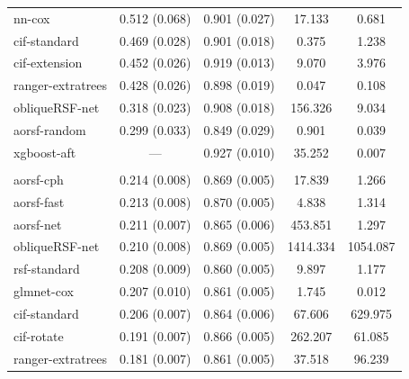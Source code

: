 \documentclass[twoside,11pt]{article}\usepackage[]{graphicx}\usepackage[]{xcolor}
\newenvironment{knitrout}{}{} %
\begin{document}
\begin{knitrout}
\begin{longtable}[t]{lcccc}
\hspace{1em}nn-cox & 0.512 (0.068) & 0.901 (0.027) & 17.133 & 0.681\\
\hspace{1em}cif-standard & 0.469 (0.028) & 0.901 (0.018) & 0.375 & 1.238\\
\hspace{1em}cif-extension & 0.452 (0.026) & 0.919 (0.013) & 9.070 & 3.976\\
\hspace{1em}ranger-extratrees & 0.428 (0.026) & 0.898 (0.019) & 0.047 & 0.108\\
\hspace{1em}obliqueRSF-net & 0.318 (0.023) & 0.908 (0.018) & 156.326 & 9.034\\
\hspace{1em}aorsf-random & 0.299 (0.033) & 0.849 (0.029) & 0.901 & 0.039\\
\hspace{1em}xgboost-aft & --- & 0.927 (0.010) & 35.252 & 0.007\\
\addlinespace[0.3em]
\multicolumn{5}{l}{\textit{\textbf{Non-alcohol fatty liver disease; death, n = 17549, p = 24}}}\\
\hline
\hspace{1em}aorsf-cph & 0.214 (0.008) & 0.869 (0.005) & 17.839 & 1.266\\
\hspace{1em}aorsf-fast & 0.213 (0.008) & 0.870 (0.005) & 4.838 & 1.314\\
\hspace{1em}aorsf-net & 0.211 (0.007) & 0.865 (0.006) & 453.851 & 1.297\\
\hspace{1em}obliqueRSF-net & 0.210 (0.008) & 0.869 (0.005) & 1414.334 & 1054.087\\
\hspace{1em}rsf-standard & 0.208 (0.009) & 0.860 (0.005) & 9.897 & 1.177\\
\hspace{1em}glmnet-cox & 0.207 (0.010) & 0.861 (0.005) & 1.745 & 0.012\\
\hspace{1em}cif-standard & 0.206 (0.007) & 0.864 (0.006) & 67.606 & 629.975\\
\hspace{1em}cif-rotate & 0.191 (0.007) & 0.866 (0.005) & 262.207 & 61.085\\
\hspace{1em}ranger-extratrees & 0.181 (0.007) & 0.861 (0.005) & 37.518 & 96.239\\

\end{longtable}
\end{knitrout}
\end{document}
